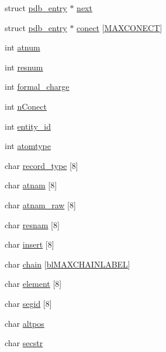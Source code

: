 \begin{DoxyCompactItemize}
struct \hyperlink{structpdb__entry}{pdb\-\_\-entry} $\ast$ \hyperlink{structpdb__entry_a9cc124a622ed031128bab9aac13f9145}{next}
\item 
struct \hyperlink{structpdb__entry}{pdb\-\_\-entry} $\ast$ \hyperlink{structpdb__entry_a6115e9a0a6109e8dce256fa256fd3dc9}{conect} \mbox{[}\hyperlink{pdb_8h_ab9347020d0f14c434abf184a80351f75}{M\-A\-X\-C\-O\-N\-E\-C\-T}\mbox{]}
\item 
int \hyperlink{structpdb__entry_af0f05b6c256a3631c9735a45190bc2ae}{atnum}
\item 
int \hyperlink{structpdb__entry_a7503a437042b8ae030eefb90decd7ceb}{resnum}
\item 
int \hyperlink{structpdb__entry_a71dd94abbd2bc0399815e99bd3d42565}{formal\-\_\-charge}
\item 
int \hyperlink{structpdb__entry_aa72c88ae20e4abf7effe69444a442867}{n\-Conect}
\item 
int \hyperlink{structpdb__entry_add86dc86465724759eb6939ffa489005}{entity\-\_\-id}
\item 
int \hyperlink{structpdb__entry_a507b61dfebb9c3eb396cd9ef27f84aae}{atomtype}
\item 
char \hyperlink{structpdb__entry_ac3b9b5be75a753a35e50eaf08be8e77e}{record\-\_\-type} \mbox{[}8\mbox{]}
\item 
char \hyperlink{structpdb__entry_a0982e141e36a2d4299d6555e0a1496cb}{atnam} \mbox{[}8\mbox{]}
\item 
char \hyperlink{structpdb__entry_a2dd38672a2991bc568e105a24b3c936b}{atnam\-\_\-raw} \mbox{[}8\mbox{]}
\item 
char \hyperlink{structpdb__entry_a6f47476bfe0dd0abc0ade4a21127dfc2}{resnam} \mbox{[}8\mbox{]}
\item 
char \hyperlink{structpdb__entry_a8cc72faf0908e6fff29637c614e608ed}{insert} \mbox{[}8\mbox{]}
\item 
char \hyperlink{structpdb__entry_abe96afafc1017db40e25d4183a058bc5}{chain} \mbox{[}\hyperlink{pdb_8h_a71c7f291062e2d98b987937309365578}{bl\-M\-A\-X\-C\-H\-A\-I\-N\-L\-A\-B\-E\-L}\mbox{]}
\item 
char \hyperlink{structpdb__entry_a780be116469a48c4b1d531bafb335f99}{element} \mbox{[}8\mbox{]}
\item 
char \hyperlink{structpdb__entry_ad43d2b0183a7d5531f51b9a30369e805}{segid} \mbox{[}8\mbox{]}
\item 
char \hyperlink{structpdb__entry_aac30c1bea908a7bb889d5e09d60279e8}{altpos}
\item 
char \hyperlink{structpdb__entry_ab7cdf860f05e4d3fc40b6f1f7a651eef}{secstr}
\end{DoxyCompactItemize}


